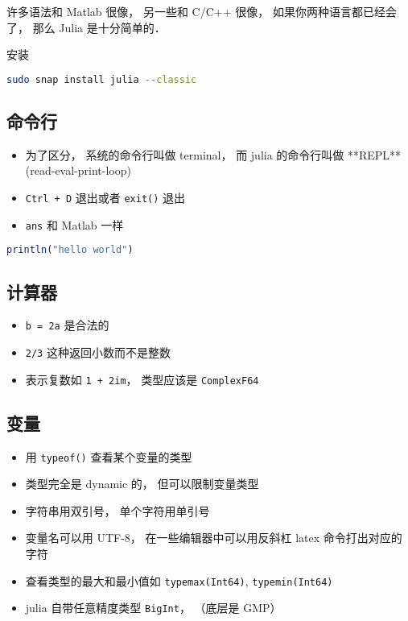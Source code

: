 
\begin{issues}
\issueDraft
\end{issues}

许多语法和 Matlab 很像， 另一些和 C/C++ 很像， 如果你两种语言都已经会了， 那么 Julia 是十分简单的．

安装
\begin{lstlisting}[language=bash]
sudo snap install julia --classic
\end{lstlisting}

\subsection{命令行}
\begin{itemize}
\item 为了区分， 系统的命令行叫做 terminal， 而 julia 的命令行叫做 **REPL** (read-eval-print-loop)
\item \verb|Ctrl + D| 退出或者 \verb|exit()| 退出
\item \verb|ans| 和 Matlab 一样
\end{itemize}

\begin{lstlisting}[language=julia]
println("hello world")
\end{lstlisting}

\subsection{计算器}
\begin{itemize}
\item \verb|b = 2a| 是合法的
\item \verb|2/3| 这种返回小数而不是整数
\item 表示复数如 \verb|1 + 2im|， 类型应该是 \verb|ComplexF64|
\end{itemize}

\subsection{变量}
\begin{itemize}
\item 用 \verb|typeof()| 查看某个变量的类型
\item 类型完全是 dynamic 的， 但可以限制变量类型
\item 字符串用双引号， 单个字符用单引号
\item 变量名可以用 UTF-8， 在一些编辑器中可以用反斜杠 latex 命令打出对应的字符
\item 查看类型的最大和最小值如 \verb|typemax(Int64)|, \verb|typemin(Int64)|
\item julia 自带任意精度类型 \verb|BigInt|，  （底层是 GMP）
\end{itemize}

